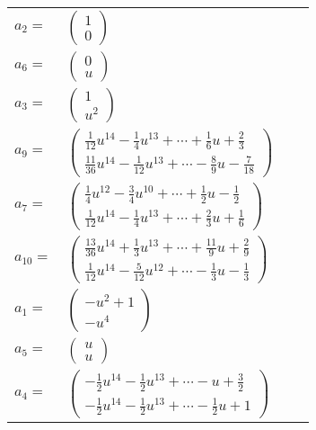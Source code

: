 \documentclass[1p]{elsarticle_modified}
\theoremstyle{definition}
\begin{document}
\begin{tabular}{m{7pt} m{180pt} m{7pt} m{180pt} }
\flushright $a_{2}=$&$\begin{pmatrix}1\\0\end{pmatrix}$ \\
\flushright $a_{6}=$&$\begin{pmatrix}0\\u\end{pmatrix}$ \\
\flushright $a_{3}=$&$\begin{pmatrix}1\\u^2\end{pmatrix}$ \\
\flushright $a_{9}=$&$\begin{pmatrix}\frac{1}{12} u^{14}-\frac{1}{4} u^{13}+\cdots+\frac{1}{6} u+\frac{2}{3}\\\frac{11}{36} u^{14}-\frac{1}{12} u^{13}+\cdots-\frac{8}{9} u-\frac{7}{18}\end{pmatrix}$ \\
\flushright $a_{7}=$&$\begin{pmatrix}\frac{1}{4} u^{12}-\frac{3}{4} u^{10}+\cdots+\frac{1}{2} u-\frac{1}{2}\\\frac{1}{12} u^{14}-\frac{1}{4} u^{13}+\cdots+\frac{2}{3} u+\frac{1}{6}\end{pmatrix}$ \\
\flushright $a_{10}=$&$\begin{pmatrix}\frac{13}{36} u^{14}+\frac{1}{3} u^{13}+\cdots+\frac{11}{9} u+\frac{2}{9}\\\frac{1}{12} u^{14}-\frac{5}{12} u^{12}+\cdots-\frac{1}{3} u-\frac{1}{3}\end{pmatrix}$ \\
\flushright $a_{1}=$&$\begin{pmatrix}- u^2+1\\- u^4\end{pmatrix}$ \\
\flushright $a_{5}=$&$\begin{pmatrix}u\\u\end{pmatrix}$ \\
\flushright $a_{4}=$&$\begin{pmatrix}-\frac{1}{2} u^{14}-\frac{1}{2} u^{13}+\cdots- u+\frac{3}{2}\\-\frac{1}{2} u^{14}-\frac{1}{2} u^{13}+\cdots-\frac{1}{2} u+1\end{pmatrix}$ \\

\end{tabular}
\end{document}
